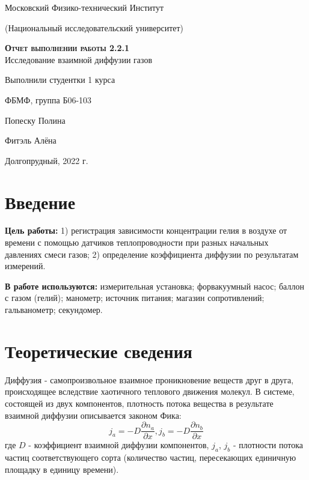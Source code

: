 \documentclass[12pt,a4paper]{article}
\begin{document}
\begin{titlepage}
  \begin{center}
    \huge
    Московский Физико-технический Институт
    
    (Национальный исследовательский университет)
    \vspace{0.5cm}

   
    \vspace{0.25cm}
 
    \vfill
 
    \vfill

    \textsc{\bf{Отчет выполнении работы 2.2.1}}\\[3mm]
    
    {\LARGE Исследование взаимной диффузии газов}
  \bigskip
    \vfill
    
\end{center}
\vfill
\begin{flushright}

    Выполнили студентки 1 курса
    
    ФБМФ, группа Б06-103

    Попеску Полина
    
    
    Фитэль Алёна

\end{flushright}
\bigskip


\vfill

\begin{center}
  Долгопрудный, 2022 г.
\end{center}
\end{titlepage}

\section{Введение}

\textbf{Цель работы:} 1)  регистрация  зависимости  концентрации   гелия в воздухе от времени с помощью датчиков теплопроводности при разных начальных давлениях смеси газов; 2) определение коэффициента диффузии по результатам измерений.

\textbf{В работе используются:} измерительная установка; форвакуумный насос; баллон с газом (гелий); манометр; источник питания; магазин сопротивлений; гальванометр; секундомер.

\section{Теоретические сведения}

Диффузия - самопроизвольное взаимное проникновение веществ друг в друга,  происходящее вследствие хаотичного теплового движения молекул.  
В системе, состоящей из двух компонентов,  плотность потока вещества в результате взаимной диффузии описывается законом Фика:
\begin{equation}
j_a = -D\frac{\partial n_a}{\partial x}, j_b = -D\frac{\partial n_b}{\partial x}
\end{equation}
где $D$ - коэффициент взаимной диффузии компонентов, $j_a$,  $j_b$ - плотности потока частиц соответствующего сорта (количество частиц, пересекающих единичную площадку в единицу времени).\\
\end{document}
